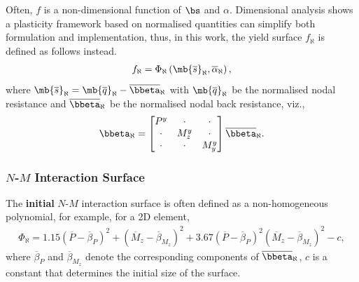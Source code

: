 Often, $f$ is a non-dimensional function of $\bs$ and $\alpha$. Dimensional analysis shows a plasticity framework based on normalised quantities can simplify both formulation and implementation, thus, in this work, the yield surface $f_\aleph$ is defined as follows instead.
\begin{gather}
f_\aleph=\Phi_\aleph\left(\mb{\overline{s}}_\aleph,\overline{\alpha}_\aleph\right),
\end{gather}
where $\mb{\overline{s}}_\aleph=\mb{\overline{q}}_\aleph-\overline{\bbeta}_\aleph$ with $\mb{\overline{q}}_\aleph$ be the normalised nodal resistance  and $\overline{\bbeta}_\aleph$ be the normalised nodal back resistance, viz.,
\begin{gather}
\bbeta_\aleph=\begin{bmatrix}
P^y&\cdot&\cdot\\\cdot&M_z^y&\cdot\\\cdot&\cdot&M_y^y
\end{bmatrix}\overline{\bbeta}_\aleph.
\end{gather}
\subsubsection{$N$-$M$ Interaction Surface}
The \textbf{initial} $N$-$M$ interaction surface is often defined as a non-homogeneous polynomial, for example, for a 2D element,
\begin{gather*}
\Phi_\aleph=1.15\left(\overline{P}-\overline{\beta}_P\right)^2+\left(\overline{M}_z-\overline{\beta}_{M_z}\right)^2+3.67\left(\overline{P}-\overline{\beta}_P\right)^2\left(\overline{M}_z-\overline{\beta}_{M_z}\right)^2-c,
\end{gather*}
where $\overline{\beta}_P$ and $\overline{\beta}_{M_z}$ denote the corresponding components of $\overline{\bbeta}_\aleph$, $c$ is a constant that determines the initial size of the surface.

